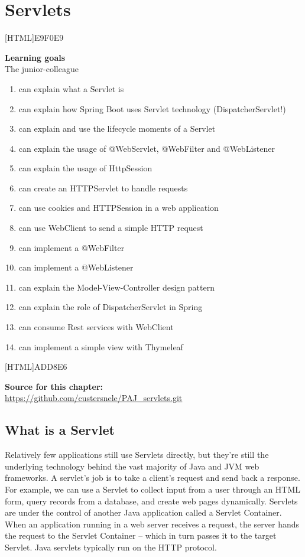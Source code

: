 \chapter{Servlets}

[HTML]{E9F0E9}{\parbox{\textwidth}{%
\noindent \textbf{Learning goals}\\
The junior-colleague
\begin{enumerate}[nolistsep]
\item can explain what a Servlet is
\item can explain how Spring Boot uses Servlet technology (DispatcherServlet!)
\item can explain and use the lifecycle moments of a Servlet
\item can explain the usage of @WebServlet, @WebFilter and @WebListener
\item can explain the usage of HttpSession
\item can create an HTTPServlet to handle requests
\item can use cookies and HTTPSession in a web application
\item can use WebClient to send a simple HTTP request 
\item can implement a @WebFilter
\item can implement a @WebListener
\item can explain the Model-View-Controller design pattern
\item can explain the role of DispatcherServlet in Spring
\item can consume Rest services with WebClient
\item can implement a simple view with Thymeleaf
\end{enumerate}
}}

[HTML]{ADD8E6}{\parbox{\textwidth}{%
\noindent \textbf{Source for this chapter:}\\
\url{https://github.com/custersnele/PAJ_servlets.git}
}}

\section{What is a Servlet}

Relatively few applications still use Servlets directly,  but they're still the underlying technology behind the vast majority of Java and JVM web frameworks.
A servlet’s job is to take a client’s request and send back a response.
For example, we can use a Servlet to collect input from a user through an HTML form, query records from a database, and create web pages dynamically.
Servlets are under the control of another Java application called a Servlet Container. When an application running in a web server receives a request, the server hands the request to the Servlet Container – which in turn passes it to the target Servlet.
Java servlets typically run on the HTTP protocol. 

